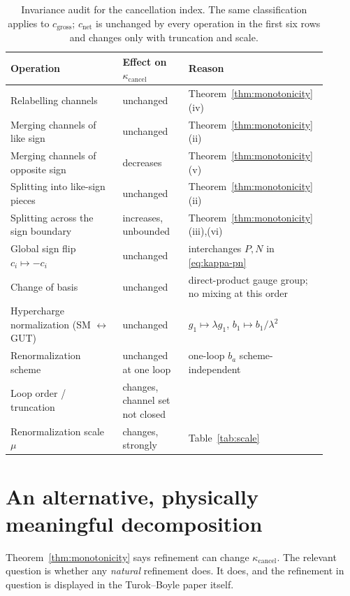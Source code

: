 \documentclass[11pt]{article}
\theoremstyle{definition}
\theoremstyle{remark}
\newcommand{\net}{c_{\mathrm{net}}}
\newcommand{\gross}{c_{\mathrm{gross}}}
\newcommand{\kcancel}{\kappa_{\mathrm{cancel}}}
\begin{document}
\begin{table}[t]
\centering
\small
\begin{tabular}{@{}p{0.34\linewidth} p{0.20\linewidth} p{0.36\linewidth}@{}}
\toprule
Operation & Effect on $\kcancel$ & Reason \\
\midrule
Relabelling channels & unchanged & Theorem~\ref{thm:monotonicity}(iv) \\
Merging channels of like sign & unchanged & Theorem~\ref{thm:monotonicity}(ii) \\
Merging channels of opposite sign & decreases & Theorem~\ref{thm:monotonicity}(v) \\
Splitting into like-sign pieces & unchanged & Theorem~\ref{thm:monotonicity}(ii) \\
Splitting across the sign boundary & increases, unbounded & Theorem~\ref{thm:monotonicity}(iii),(vi) \\
Global sign flip $c_i \mapsto -c_i$ & unchanged & interchanges $P,N$ in \eqref{eq:kappa-pn} \\
Change of basis & unchanged & direct-product gauge group; no mixing at this order \\
Hypercharge normalization (SM $\leftrightarrow$ GUT) & unchanged & $g_1\mapsto\lambda g_1$, $b_1 \mapsto b_1/\lambda^2$ \\
Renormalization scheme & unchanged at one loop & one-loop $b_a$ scheme-independent \\
Loop order / truncation & changes, channel set not closed & \citet{MachacekVaughn1983,Mihaila2012} \\
Renormalization scale $\mu$ & changes, strongly & Table~\ref{tab:scale} \\
\bottomrule
\end{tabular}
\caption{Invariance audit for the cancellation index. The same classification applies to $\gross$;
$\net$ is unchanged by every operation in the first six rows and changes only with truncation and
scale.}
\label{tab:audit}
\end{table}

\section{An alternative, physically meaningful decomposition}
\label{sec:level2}

Theorem~\ref{thm:monotonicity} says refinement can change $\kcancel$. The relevant question is
whether any \emph{natural} refinement does. It does, and the refinement in question is displayed in
the Turok--Boyle paper itself.
\end{document}
